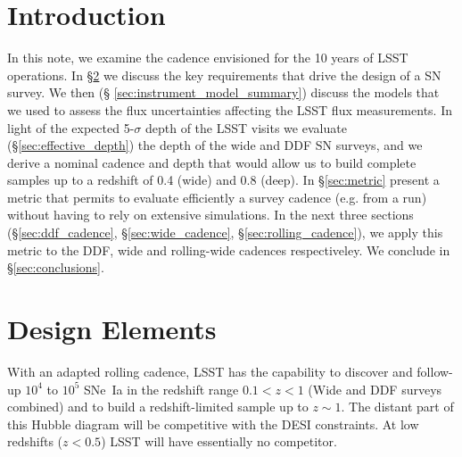 \documentclass[\docopts]{\docclass}
\begin{document}
\section{Introduction}
\label{sec:intro}


In this note, we examine the cadence envisioned for the 10 years of
LSST operations.  In \S\ref{sec:design_notes} we discuss the key
requirements that drive the design of a SN survey.  We then (\S
\ref{sec:instrument_model_summary}) discuss the models that we used to
assess the flux uncertainties affecting the LSST flux measurements.
In light of the expected 5-$\sigma$ depth of the LSST visits we
evaluate (\S\ref{sec:effective_depth}) the depth of the wide and DDF
SN surveys, and we derive a nominal cadence and depth that would allow
us to build complete samples up to a redshift of 0.4 (wide) and 0.8
(deep). In \S\ref{sec:metric} present a metric that permits to
evaluate efficiently a survey cadence (e.g. from a  run)
without having to rely on extensive simulations.  In the next three
sections (\S\ref{sec:ddf_cadence}, \S\ref{sec:wide_cadence},
\S\ref{sec:rolling_cadence}), we apply this metric to the 
DDF, wide and rolling-wide cadences respectiveley. We conclude in
\S\ref{sec:conclusions}.




\section{Design Elements}
\label{sec:design_notes}

With an adapted rolling cadence, LSST has the capability to discover
and follow-up  $10^4$ to $10^5$ SNe~Ia in the redshift range $0.1 < z <
1$ (Wide and DDF surveys combined) and to build a redshift-limited
sample up to $z \sim 1$. The distant part of this Hubble diagram will
be competitive with the DESI constraints. At low redshifts ($z < 0.5$)
LSST will have essentially no competitor.

\end{document}
